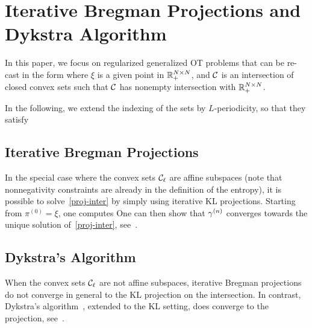 

\section{Iterative Bregman Projections and Dykstra Algorithm}


In this paper, we focus on regularized generalized OT problems that can be re-cast in the form
\eql{\label{proj-inter}
	\min_{\pi \in \Cc}  \KLdiv{\pi}{\xi}
}
where $\xi$ is a given point in $\mathbb{R}_+^{N\times N}$, and $\mathcal{C}$ is an intersection of closed convex sets
such that $\mathcal{C}$ has nonempty intersection with $\mathbb{R}_+^{N\times N}$. 

In the following, we extend the indexing of the sets by $L$-periodicity, so that they satisfy


\subsection{Iterative Bregman Projections}
\label{sec-iterative-bregman}

In the special case where the convex sets $\mathcal{C}_\ell$ are  affine subspaces (note that nonnegativity constraints are already in the definition of the entropy), it is possible to solve~\eqref{proj-inter} by simply using iterative KL projections. Starting from $\pi^{(0)} = \xi$, one computes
One can then show that $\gamma^{(n)}$ converges towards the unique solution of~\eqref{proj-inter},
see~\cite{bregman1967relaxation}. 



\subsection{Dykstra's Algorithm}

When the convex sets $\mathcal{C}_\ell$ are not affine subspaces, iterative Bregman projections do not converge in general to the KL projection on the intersection. In contrast, Dykstra's algorithm~\cite{Dykstra83}, extended to the KL setting, does converge to the projection, see~\cite{bauschke-lewis}.

